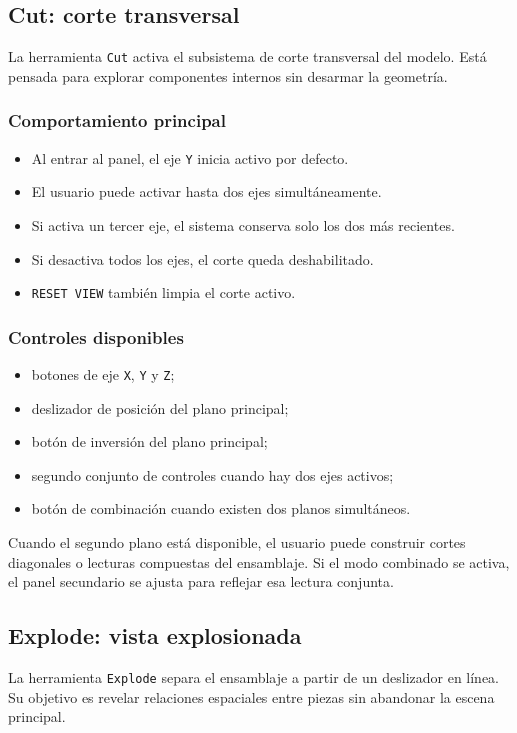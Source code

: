 \documentclass[12pt,letterpaper]{article}
\begin{document}
\subsection{Cut: corte transversal}
La herramienta \texttt{Cut} activa el subsistema de corte transversal del modelo. Está pensada para explorar componentes internos sin desarmar la geometría.

\subsubsection{Comportamiento principal}
\begin{itemize}
    \item Al entrar al panel, el eje \texttt{Y} inicia activo por defecto.
    \item El usuario puede activar hasta dos ejes simultáneamente.
    \item Si activa un tercer eje, el sistema conserva solo los dos más recientes.
    \item Si desactiva todos los ejes, el corte queda deshabilitado.
    \item \texttt{RESET VIEW} también limpia el corte activo.
\end{itemize}

\subsubsection{Controles disponibles}
\begin{itemize}
    \item botones de eje \texttt{X}, \texttt{Y} y \texttt{Z};
    \item deslizador de posición del plano principal;
    \item botón de inversión del plano principal;
    \item segundo conjunto de controles cuando hay dos ejes activos;
    \item botón de combinación cuando existen dos planos simultáneos.
\end{itemize}

\noindent Cuando el segundo plano está disponible, el usuario puede construir cortes diagonales o lecturas compuestas del ensamblaje. Si el modo combinado se activa, el panel secundario se ajusta para reflejar esa lectura conjunta.

\subsection{Explode: vista explosionada}
La herramienta \texttt{Explode} separa el ensamblaje a partir de un deslizador en línea. Su objetivo es revelar relaciones espaciales entre piezas sin abandonar la escena principal.
\end{document}
